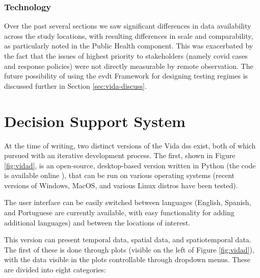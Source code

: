 \subsubsection{Technology}

Over the past several sections we saw significant differences in data availability across the study locations, with resulting differences in scale and comparability, as particularly noted in the Public Health component. This was exacerbated by the fact that the issues of highest priority to stakeholders (namely \ac{covid} cases and response policies) were not directly measurable by remote observation. The future possibility of using the \ac{evdt} Framework for designing testing regimes is discussed further in Section \ref{sec:vida-discuss}.


\section{Decision Support System} \label{sec:vida-dss}

At the time of writing, two distinct versions of the Vida \ac{dss} exist, both of which pursued with an iterative development process. The first, shown in Figure \ref{fig:vidad}, is an open-source, desktop-based version written in Python (the code is available online \cite{reidMITVidaRepository2021}), that can be run on various operating systems (recent versions of Windows, MacOS, and various Linux distros have been tested). 

The user interface can be easily switched between languages (English, Spanish, and Portuguese are currently available, with easy functionality for adding additional languages) and between the locations of interest.

This version can present temporal data, spatial data, and spatiotemporal data. The first of these is done through plots (visible on the left of Figure \ref{fig:vidad}), with the data visible in the plots controllable through dropdown menus. These are divided into eight categories:

